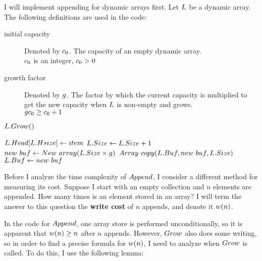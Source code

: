 \HdrDynArrayImpl

I will implement appending for dynamic arrays first. Let $L$ be a dynamic array. The following definitions are used in the code:

\begin{description}
	\item[initial capacity] Denoted by $c_0$. The capacity of an empty dynamic array.\\
	{\HdrAssumptions} $c_0$ is an integer, $c_0 > 0$
	\item[growth factor] Denoted by $g$. The factor by which the current capacity is multiplied to get the new capacity when $L$ is non-empty and grows.\\
	{\HdrAssumptions} $gc_0 \geq c_0 + 1$
\end{description}

\begin{algorithm}
	\begin{algorithmic}[1]
				\State $L.Grow()$
			\EndIf
			
			\State $L.Head[L.Hsize] \gets item$
			\State $L.Size \gets L.Size + 1$
		\EndProcedure
		\Statex
			\State $new\ buf \gets New\ array(L.Size \times g)$
			\State $\FuncArrayCopy(\VarList.\FieldBuffer, new\ buf, \VarList.\FieldSize)$
			\State $L.Buf \gets new\ buf$
		\EndProcedure
	\end{algorithmic}
\end{algorithm}

\HdrTimeComplex

Before I analyze the time complexity of $Append$, I consider a different method for measuring its cost. Suppose I start with an empty collection and $n$ elements are appended. How many times is an element stored in an array? I will term the answer to this question the \textbf{write cost} of $n$ appends, and denote it $w(n)$.

In the code for $Append$, one array store is performed unconditionally, so it is apparent that $w(n) \geq n$ after $n$ appends. However, $Grow$ also does some writing, so in order to find a precise formula for $w(n)$, I need to analyze when $Grow$ is called. To do this, I use the following lemma:

